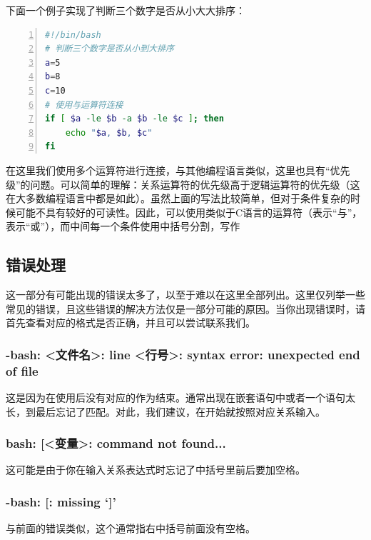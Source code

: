 下面一个例子实现了判断三个数字是否从小大大排序：

\begin{lstlisting}[language=bash,caption=sort,numbers=left]
#!/bin/bash
# 判断三个数字是否从小到大排序
a=5
b=8
c=10
# 使用与运算符连接
if [ $a -le $b -a $b -le $c ]; then
	echo "$a, $b, $c"
fi
\end{lstlisting}

\begin{extend}
    在这里我们使用多个运算符进行连接，与其他编程语言类似，这里也具有“优先级”的问题。可以简单的理解：关系运算符的优先级高于逻辑运算符的优先级（这在大多数编程语言中都是如此）。虽然上面的写法比较简单，但对于条件复杂的时候可能不具有较好的可读性。因此，可以使用类似于C语言的运算符（\code{\&\&}表示“与”，\code{||}表示“或”），而中间每一个条件使用中括号分割，写作
\end{extend}


\subsection{错误处理}\label{subsec:判断语句-错误处理}

这一部分有可能出现的错误太多了，以至于难以在这里全部列出。这里仅列举一些常见的错误，且这些错误的解决方法仅是一部分可能的原因。当你出现错误时，请首先查看对应的格式是否正确，并且可以尝试联系我们。

\subsubsection{-bash: <文件名>: line <行号>: syntax error: unexpected end of file}

这是因为在使用后没有对应的作为结束。通常出现在嵌套语句中或者一个语句太长，到最后忘记了匹配。对此，我们建议，在开始就按照对应关系输入。

\subsubsection{bash: [<变量>: command not found...}

这可能是由于你在输入关系表达式时忘记了中括号里前后要加空格。

\subsubsection{-bash: [: missing `]'}
与前面的错误类似，这个通常指右中括号前面没有空格。